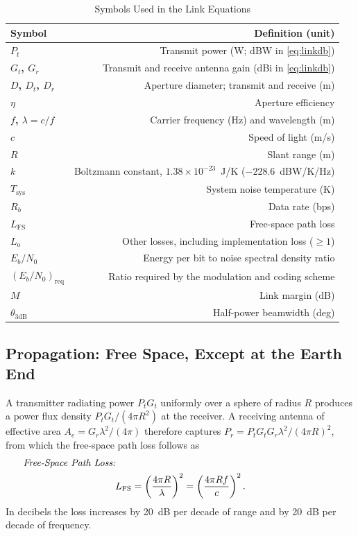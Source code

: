 \documentclass{IEEEoj}
\newcommand{\eqname}[1]{\makebox[\linewidth][l]{\hspace{1em}\textit{#1:}}\notag}
\begin{document}
\begin{table}[!t]
\caption{Symbols Used in the Link Equations}
\label{tab:notation}
\centering
\footnotesize
\begin{tabularx}{\columnwidth}{@{}>{\bfseries}lR}
\toprule
{}\textbf{Symbol} & \textbf{Definition (unit)} \\
\midrule
$P_t$ & Transmit power (W; dBW in \eqref{eq:linkdb}) \\
$G_t$, $G_r$ & Transmit and receive antenna gain (dBi in \eqref{eq:linkdb}) \\
$D$, $D_t$, $D_r$ & Aperture diameter; transmit and receive (m) \\
$\eta$ & Aperture efficiency \\
$f$, $\lambda = c/f$ & Carrier frequency (Hz) and wavelength (m) \\
$c$ & Speed of light (m/s) \\
$R$ & Slant range (m) \\
$k$ & Boltzmann constant, $1.38\times10^{-23}$~J/K ($-228.6$~dBW/K/Hz) \\
$T_{\mathrm{sys}}$ & System noise temperature (K) \\
$R_b$ & Data rate (bps) \\
$L_{\mathrm{FS}}$ & Free-space path loss \\
$L_{\mathrm{o}}$ & Other losses, including implementation loss ($\geq 1$) \\
$E_b/N_0$ & Energy per bit to noise spectral density ratio \\
$(E_b/N_0)_{\mathrm{req}}$ & Ratio required by the modulation and coding scheme \\
$M$ & Link margin (dB) \\
$\theta_{3\mathrm{dB}}$ & Half-power beamwidth (deg) \\
\bottomrule
\end{tabularx}
\end{table}




\subsection{Propagation: Free Space, Except at the Earth End}

A transmitter radiating power $P_t G_t$ uniformly over a sphere of radius $R$ produces a power flux density $P_t G_t / (4\pi R^2)$ at the receiver. A receiving antenna of effective area $A_e = G_r \lambda^2 / (4\pi)$ therefore captures $P_r = P_t G_t G_r \lambda^2 / (4\pi R)^2$, from which the free-space path loss follows as
\begin{gather}
\eqname{Free-Space Path Loss}\\
L_{\mathrm{FS}} = \left(\frac{4\pi R}{\lambda}\right)^{2} = \left(\frac{4\pi R f}{c}\right)^{2}.
\label{eq:fspl}
\end{gather}
In decibels the loss increases by \SI{20}{dB} per decade of range and by \SI{20}{dB} per decade of frequency.
\end{document}
